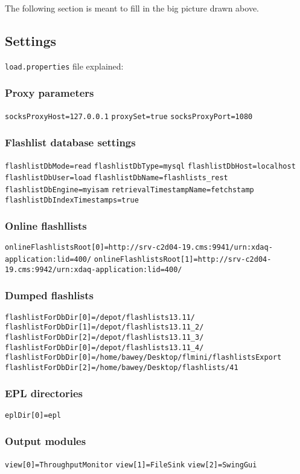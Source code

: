 The following section is meant to fill in the big picture drawn above.

\subsection{Settings}
\texttt{load.properties} file explained:

\subsubsection{Proxy parameters}
\texttt{socksProxyHost=127.0.0.1}
\texttt{proxySet=true}
\texttt{socksProxyPort=1080}
\subsubsection{Flashlist database settings}
\texttt{flashlistDbMode=read}
\texttt{flashlistDbType=mysql}
\texttt{flashlistDbHost=localhost}
\texttt{flashlistDbUser=load}
\texttt{flashlistDbName=flashlists\_rest}
\texttt{flashlistDbEngine=myisam}
\texttt{retrievalTimestampName=fetchstamp}
\texttt{flashlistDbIndexTimestamps=true}

\subsubsection{Online flashllists}

\texttt{onlineFlashlistsRoot[0]=http://srv-c2d04-19.cms:9941/urn:xdaq-application:lid=400/}
\texttt{onlineFlashlistsRoot[1]=http://srv-c2d04-19.cms:9942/urn:xdaq-application:lid=400/}

\subsubsection{Dumped flashlists}
\texttt{flashlistForDbDir[0]=/depot/flashlists13.11/}
\texttt{flashlistForDbDir[1]=/depot/flashlists13.11\_2/}
\texttt{flashlistForDbDir[2]=/depot/flashlists13.11\_3/}
\texttt{flashlistForDbDir[0]=/depot/flashlists13.11\_4/}
\texttt{flashlistForDbDir[0]=/home/bawey/Desktop/flmini/flashlistsExport}
\texttt{flashlistForDbDir[2]=/home/bawey/Desktop/flashlists/41}


\subsubsection{EPL directories}
\texttt{eplDir[0]=epl}


\subsubsection{Output modules}
\texttt{view[0]=ThroughputMonitor}
\texttt{view[1]=FileSink}
\texttt{view[2]=SwingGui}


